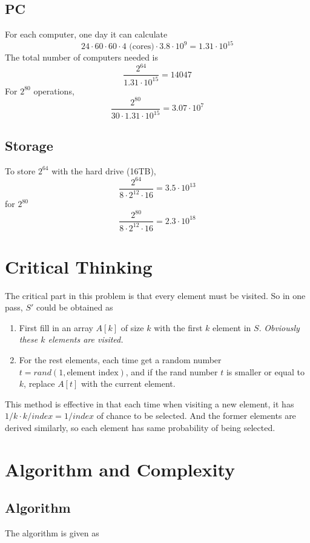 \documentclass[A4paper]{article}
\begin{document}
\subsection{PC}
For each computer, one day it can calculate
\[
	24\cdot 60\cdot 60\cdot 4 \text{ (cores)} \cdot 3.8\cdot 10^9 = 1.31\cdot 10^{15}
\]
The total number of computers needed is 
\[
	\frac{2^{64}}{1.31\cdot 10^{15}} = 14047
\]		
For $2^{80}$ operations,
\[
	\frac{2^{80}}{30\cdot 1.31\cdot 10^{15}} = 3.07\cdot 10^7
\]	
\subsection{Storage}
To store $2^{64}$ with the hard drive (16TB),
\[
	\frac{2^{64}}{8\cdot 2^{12}\cdot 16} = 3.5\cdot 10^13
\]	
for $2^{80}$
\[
	\frac{2^{80}}{8\cdot 2^{12}\cdot 16} = 2.3\cdot 10^18
\]
\section{Critical Thinking}
The critical part in this problem is that every element must be visited. So in one pass, $S'$ could be obtained as 
\begin{enumerate}
\item First fill in an array $A[k]$ of size $k$ with the first $k$ element in $S$. \textit{Obviously these $k$ elements are visited.}
\item For the rest elements, each time get a random number $t = rand(1,\text{element index})$, and if the rand number $t$ is smaller or equal to $k$, replace $A[t]$ with the current element.
\end{enumerate}
This method is effective in that each time when visiting a new element, it has $1/k\cdot k/index= 1/index$ of chance to be selected. And the former elements are derived similarly, so each element has same probability of being selected.
\newpage
\section{Algorithm and Complexity}
\subsection{Algorithm}
The algorithm is given as 
\begin{algorithm}
\end{algorithm} 
\end{document}
